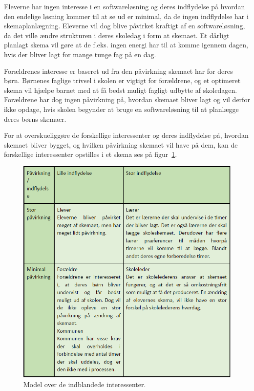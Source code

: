 Eleverne har ingen interesse i en softwareløsning og deres indflydelse på hvordan den endelige løsning kommer til at se ud er minimal, da de ingen indflydelse har i skemaplanlægning. Eleverne vil dog blive påvirket kraftigt af en softwareløsning, da det ville ændre strukturen i deres skoledag i form at skemaet. Et dårligt planlagt skema vil gøre at de f.eks. ingen energi har til at komme igennem dagen, hvis der bliver lagt for mange tunge fag på en dag.


Forældrenes interesse er baseret ud fra den påvirkning skemaet har for deres børn. Børnenes faglige trivsel i skolen er vigtigt for forældrene, og et optimeret skema vil hjælpe barnet med at få bedst muligt fagligt udbytte af skoledagen. Forældrene har dog ingen påvirkning på, hvordan skemaet bliver lagt og vil derfor ikke opdage, hvis skolen begynder at bruge en softwareløsning til at planlægge deres børns skemaer.

For at overskueliggøre de forskellige interessenter og deres indflydelse på, hvordan skemaet bliver bygget, og hvilken påvirkning skemaet vil have på dem, kan de forskellige interessenter opstilles i et skema ses på figur~\ref{fig:interessenter}.
\begin{figure}[!h]
  \centering
  \includegraphics[width=\textwidth]{partials/graphics/interessentanalyse.png}
  \caption{Model over de indblandede interessenter.}
  \label{fig:interessenter}
\end{figure}
